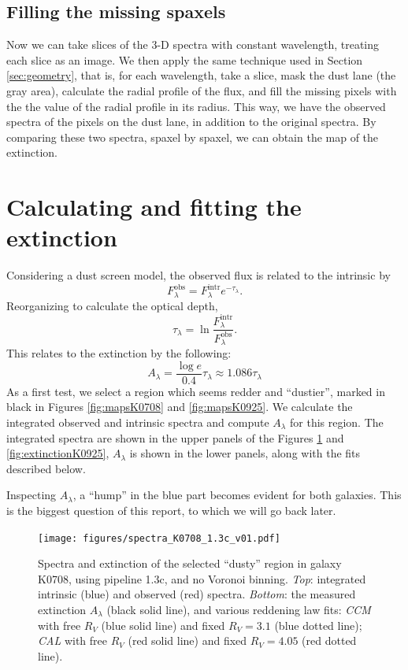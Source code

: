 \documentclass[a4paper]{article}
\def\CCM{\textit{CCM}\xspace}
\def\CAL{\textit{CAL}\xspace}
\begin{document}
\subsection{Filling the missing spaxels}
\label{sec:filling}

Now we can take slices of the 3-D spectra with constant wavelength, treating
each slice as an image. We then apply the same technique used in Section
\ref{sec:geometry}, that is, for each wavelength, take a slice, mask the dust
lane (the gray area), calculate the radial profile of the flux, and fill the
missing pixels with the the value of the radial profile in its radius. This way,
we have the observed spectra of the pixels on the dust lane, in addition to the
original spectra. By comparing these two spectra, spaxel by spaxel, we can
obtain the map of the extinction.


\section{Calculating and fitting the extinction}
\label{sec:extinction}
Considering a dust screen model, the observed flux is related to the intrinsic
by
\begin{equation}
F^\text{obs}_\lambda = F^\text{intr}_\lambda e^{-\tau_\lambda}.
\end{equation}
Reorganizing to calculate the optical depth,
\begin{equation}
\tau_\lambda = \ln \frac{F^\text{intr}_\lambda}{F^\text{obs}_\lambda}.
\end{equation}
This relates to the extinction by the following:
\begin{equation}
A_\lambda = \frac{\log e}{0.4} \tau_\lambda \approx 1.086 \tau_\lambda
\end{equation}
As a first test, we select a region which seems redder and ``dustier'', marked in
black in Figures \ref{fig:mapsK0708} and \ref {fig:mapsK0925}. We calculate the
integrated observed and intrinsic spectra and compute $A_\lambda$ for this
region. The integrated spectra are shown in the upper panels of the Figures
\ref{fig:extinctionK0708} and \ref{fig:extinctionK0925}, $A_\lambda$ is shown
in the lower panels, along with the fits described below.

Inspecting $A_\lambda$, a ``hump'' in the blue part becomes evident for both
galaxies. This is the biggest question of this report, to which we will go back
later.

\begin{figure}
\texttt{[image: figures/spectra\_K0708\_1.3c\_v01.pdf]}

\caption{Spectra and extinction of the selected ``dusty'' region in galaxy
K0708, using pipeline 1.3c, and no Voronoi binning. {\em Top}: integrated
intrinsic (blue) and observed (red) spectra.
{\em Bottom}: the measured extinction $A_\lambda$ (black solid line), and
various reddening law fits: \CCM with free $R_V$ (blue solid line) and fixed
$R_V = 3.1$ (blue dotted line); \CAL with free $R_V$ (red solid line) and fixed
$R_V = 4.05$ (red dotted line).}
\label{fig:extinctionK0708}
\end{figure}
\end{document}
